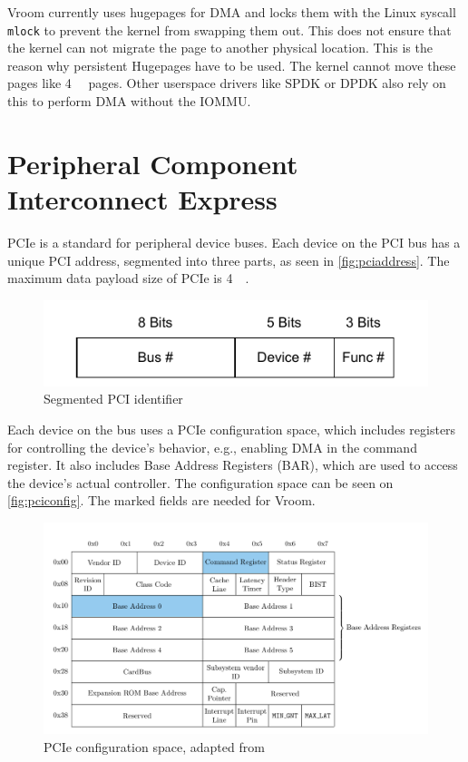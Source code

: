 Vroom currently uses hugepages for DMA and locks them with the Linux syscall \texttt{mlock} to prevent the kernel from swapping them out. This does not ensure that the kernel can not migrate the page to another physical location. This is the reason why persistent Hugepages have to be used. The kernel cannot move these pages like \qty{4}{\kibi\byte} pages. Other userspace drivers like SPDK or DPDK also rely on this to perform DMA without the IOMMU.

\section{Peripheral Component Interconnect Express}
PCIe is a standard for peripheral device buses. Each device on the PCI bus has a unique PCI address, segmented into three parts, as seen in \autoref{fig:pciaddress}. The maximum data payload size of PCIe is \qty{4}{\kibi\byte}.

\begin{figure}[H]
    \centering
    \includegraphics[width=.7\textwidth]{figures/pciaddress.pdf}
    \caption{Segmented PCI identifier}
    \label{fig:pciaddress}
\end{figure}

Each device on the bus uses a PCIe configuration space, which includes registers for controlling the device's behavior, e.g., enabling DMA in the command register. It also includes Base Address Registers (BAR), which are used to access the device's actual controller. The configuration space can be seen on \autoref{fig:pciconfig}. The marked fields are needed for Vroom.

\begin{figure}[H]
    \centering
    \includegraphics[width=\textwidth]{figures/pcie-config-space}
    \caption{PCIe configuration space, adapted from \cite{vroom}}
    \label{fig:pciconfig}
\end{figure}

